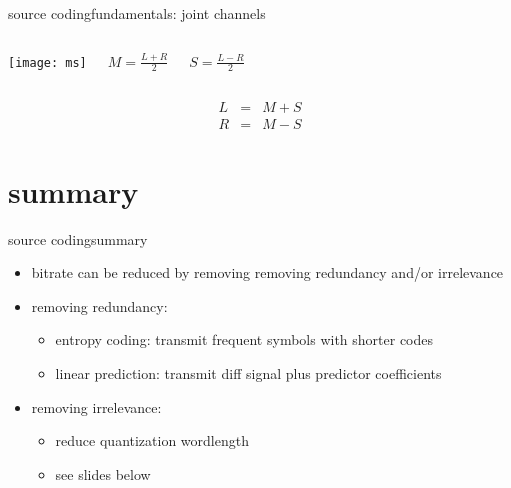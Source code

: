 	\begin{frame}{source coding}{fundamentals: joint channels}
        \vspace{-3mm}
        \begin{columns}
				\texttt{[image: ms]}
                \vspace{-47mm}
                
                
                \vspace{13mm}
                
                $M = \frac{L+R}{2}$
                
                \vspace{10mm}
                
                $S = \frac{L-R}{2}$
			\end{columns}
			\vspace{-5mm}
            \begin{eqnarray*}
                L &=& M + S\\
                R &=& M - S 
            \end{eqnarray*}
	\end{frame}

	
	
\section{summary}
		\begin{frame}{source coding}{summary}
            \begin{itemize}
                \item   bitrate can be reduced by removing removing redundancy and/or irrelevance
                \smallskip
                \item   removing redundancy:
                    \begin{itemize}
                        \item   entropy coding: transmit frequent symbols with shorter codes
                        \item   linear prediction: transmit diff signal plus predictor coefficients
                    \end{itemize}
                \smallskip
                \item   removing irrelevance:
                    \begin{itemize}
                        \item   reduce quantization wordlength
                        \item   see slides below
                    \end{itemize}
            \end{itemize}
 		\end{frame}




